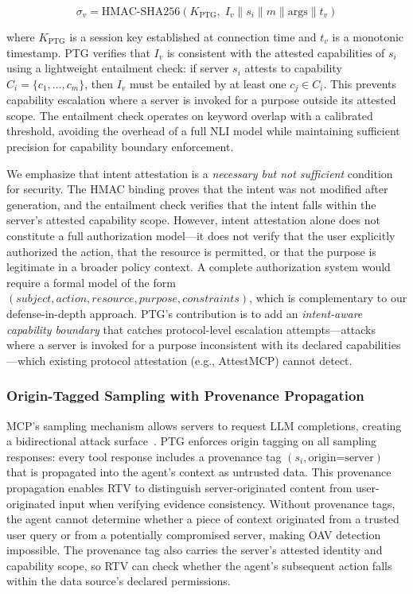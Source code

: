 \[
\sigma_v = \text{HMAC-SHA256}(K_{\text{PTG}}, \; I_v \| s_i \| m \| \text{args} \| t_v)
\]

where $K_{\text{PTG}}$ is a session key established at connection time and $t_v$ is a monotonic timestamp. PTG verifies that $I_v$ is consistent with the attested capabilities of $s_i$ using a lightweight entailment check: if server $s_i$ attests to capability $C_i = \{c_1, \ldots, c_m\}$, then $I_v$ must be entailed by at least one $c_j \in C_i$. This prevents capability escalation where a server is invoked for a purpose outside its attested scope. The entailment check operates on keyword overlap with a calibrated threshold, avoiding the overhead of a full NLI model while maintaining sufficient precision for capability boundary enforcement.

We emphasize that intent attestation is a \emph{necessary but not sufficient} condition for security. The HMAC binding proves that the intent was not modified after generation, and the entailment check verifies that the intent falls within the server's attested capability scope. However, intent attestation alone does not constitute a full authorization model---it does not verify that the user explicitly authorized the action, that the resource is permitted, or that the purpose is legitimate in a broader policy context. A complete authorization system would require a formal model of the form $(subject, action, resource, purpose, constraints)$, which is complementary to our defense-in-depth approach. PTG's contribution is to add an \emph{intent-aware capability boundary} that catches protocol-level escalation attempts---attacks where a server is invoked for a purpose inconsistent with its declared capabilities---which existing protocol attestation (e.g., AttestMCP) cannot detect.

\subsubsection{Origin-Tagged Sampling with Provenance Propagation}

MCP's sampling mechanism allows servers to request LLM completions, creating a bidirectional attack surface~\citep{maloyan2026breaking}. PTG enforces origin tagging on all sampling responses: every tool response includes a provenance tag $(s_i, \text{origin=server})$ that is propagated into the agent's context as untrusted data. This provenance propagation enables RTV to distinguish server-originated content from user-originated input when verifying evidence consistency. Without provenance tags, the agent cannot determine whether a piece of context originated from a trusted user query or from a potentially compromised server, making OAV detection impossible. The provenance tag also carries the server's attested identity and capability scope, so RTV can check whether the agent's subsequent action falls within the data source's declared permissions.

